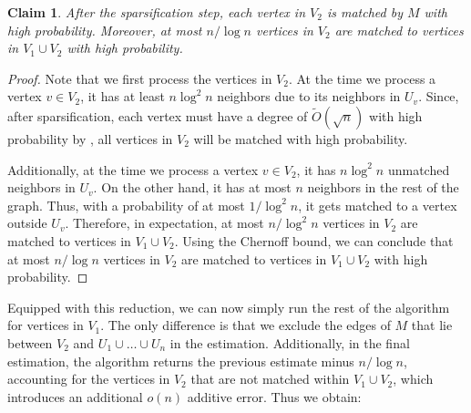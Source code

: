 \documentclass[letterpaper,11pt]{article}
\newcommand{\wt}[1]{\ensuremath{\widetilde{#1}}}
\newtheorem{claim}[lemma]{Claim}
\begin{document}
\begin{claim}
    After the sparsification step, each vertex in $V_2$ is matched by $M$ with high probability. Moreover, at most $n/\log n$ vertices in $V_2$ are matched to vertices in $V_1 \cup V_2$ with high probability.
\end{claim}
\begin{proof}
    Note that we first process the vertices in $V_2$. At the time we process a vertex $v \in V_2$, it has at least $n\log^2 n$ neighbors due to its neighbors in $U_v$. Since, after sparsification, each vertex must have a degree of $\wt{O}(\sqrt{n})$ with high probability by , all vertices in $V_2$ will be matched with high probability.

    Additionally, at the time we process a vertex $v \in V_2$, it has $n\log^2 n$ unmatched neighbors in $U_v$. On the other hand, it has at most $n$ neighbors in the rest of the graph. Thus, with a probability of at most $1/\log^2 n$, it gets matched to a vertex outside $U_v$. Therefore, in expectation, at most $n/\log^2 n$ vertices in $V_2$ are matched to vertices in $V_1 \cup V_2$. Using the Chernoff bound, we can conclude that at most $n/\log n$ vertices in $V_2$ are matched to vertices in $V_1 \cup V_2$ with high probability.
\end{proof}


Equipped with this reduction, we can now simply run the rest of the algorithm for vertices in $V_1$. The only difference is that we exclude the edges of $M$ that lie between $V_2$ and $U_1 \cup \ldots \cup U_n$ in the estimation. Additionally, in the final estimation, the algorithm returns the previous estimate minus $n/\log n$, accounting for the vertices in $V_2$ that are not matched within $V_1 \cup V_2$, which introduces an additional $o(n)$ additive error.
Thus we obtain:


\maintheoremAdjmat* 


\end{document}
